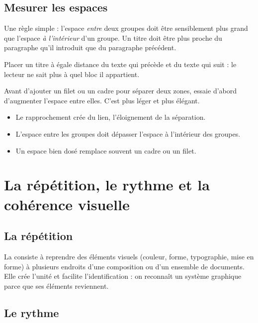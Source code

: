 \subsection{Mesurer les espaces}

Une règle simple : l'espace \emph{entre} deux groupes doit être sensiblement plus grand que l'espace \emph{à l'intérieur} d'un groupe. Un titre doit être plus proche du paragraphe qu'il introduit que du paragraphe précédent.

\begin{erreur}
Placer un titre à égale distance du texte qui précède et du texte qui suit : le lecteur ne sait plus à quel bloc il appartient.
\end{erreur}

\begin{astuce}
Avant d'ajouter un filet ou un cadre pour séparer deux zones, essaie d'abord d'augmenter l'espace entre elles. C'est plus léger et plus élégant.
\end{astuce}

\begin{retenir}
\begin{itemize}
  \item Le rapprochement crée du lien, l'éloignement de la séparation.
  \item L'espace entre les groupes doit dépasser l'espace à l'intérieur des groupes.
  \item Un espace bien dosé remplace souvent un cadre ou un filet.
\end{itemize}
\end{retenir}

\section{La répétition, le rythme et la cohérence visuelle}

\subsection{La répétition}

La  consiste à reprendre des éléments visuels (couleur, forme, typographie, mise en forme) à plusieurs endroits d'une composition ou d'un ensemble de documents. Elle crée l'unité et facilite l'identification : on reconnaît un système graphique parce que ses éléments reviennent.

\subsection{Le rythme}

